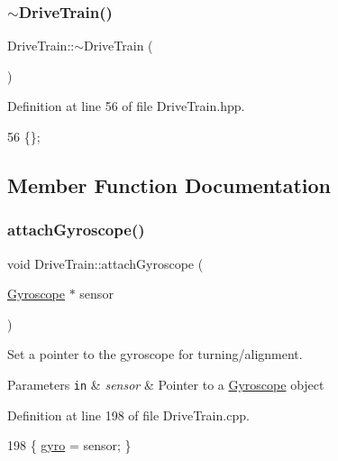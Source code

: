 \subsubsection{\texorpdfstring{$\sim$\+Drive\+Train()}{~DriveTrain()}}
{\footnotesize\ttfamily Drive\+Train\+::$\sim$\+Drive\+Train (\begin{DoxyParamCaption}{ }\end{DoxyParamCaption})\hspace{0.3cm}{\ttfamily [inline]}}



Definition at line 56 of file Drive\+Train.\+hpp.


\begin{DoxyCode}
56 \{\};
\end{DoxyCode}


\subsection{Member Function Documentation}
\mbox{\label{class_drive_train_a088f6c9f4d7aafb1e5848a3d15d3e9c5}} 
\subsubsection{\texorpdfstring{attach\+Gyroscope()}{attachGyroscope()}}
{\footnotesize\ttfamily void Drive\+Train\+::attach\+Gyroscope (\begin{DoxyParamCaption}\item[{\hyperlink{class_gyroscope}{Gyroscope} $\ast$}]{sensor }\end{DoxyParamCaption})}



Set a pointer to the gyroscope for turning/alignment. 


\begin{DoxyParams}[1]{Parameters}
\mbox{\tt in}  & {\em sensor} & Pointer to a \hyperlink{class_gyroscope}{Gyroscope} object \\
\hline
\end{DoxyParams}


Definition at line 198 of file Drive\+Train.\+cpp.


\begin{DoxyCode}
198 \{ \hyperlink{class_drive_train_a7fca76321e3bf08c0bcdc645b9e70b1d}{gyro} = sensor; \}
\end{DoxyCode}
\mbox{\label{class_drive_train_a874a58662b26684892d2efbce8fde36f}} 
